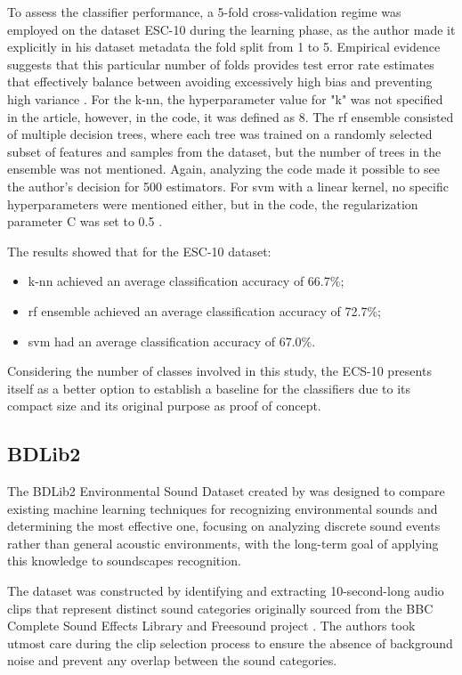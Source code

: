 To assess the classifier performance, a 5-fold cross-validation regime was employed on the dataset ESC-10 during the learning phase, as the author made it explicitly in his dataset metadata the fold split from 1 to 5. Empirical evidence suggests that this particular number of folds provides test error rate estimates that effectively balance between avoiding excessively high bias and preventing high variance \cite{James2013}. For the \gls{k-nn}, the hyperparameter value for "k" was not specified in the article, however, in the code, it was defined as 8. The \gls{rf} ensemble consisted of multiple decision trees, where each tree was trained on a randomly selected subset of features and samples from the dataset, but the number of trees in the ensemble was not mentioned. Again, analyzing the code made it possible to see the author's decision for 500 estimators. For \gls{svm} with a linear kernel, no specific hyperparameters were mentioned either, but in the code, the regularization parameter C was set to 0.5 \cite{PiczakESC2015}.

The results showed that for the ESC-10 dataset: 
\begin{itemize}
    \item \gls{k-nn} achieved an average classification accuracy of 66.7\%;
    \item \gls{rf} ensemble achieved an average classification accuracy of 72.7\%;
    \item \gls{svm} had an average classification accuracy of 67.0\%. 
\end{itemize}

Considering the number of classes involved in this study, the ECS-10 presents itself as a better option to establish a baseline for the classifiers due to its compact size and its original purpose as proof of concept.

\subsection{BDLib2}
\label{subsec:dataset_BDLib2}

The BDLib2 Environmental Sound Dataset created by \textcite{Bountourakis2015} was designed to compare existing machine learning techniques for recognizing environmental sounds and determining the most effective one, focusing on analyzing discrete sound events rather than general acoustic environments, with the long-term goal of applying this knowledge to soundscapes recognition.

The dataset was constructed by identifying and extracting 10-second-long audio clips that represent distinct sound categories originally sourced from the BBC Complete Sound Effects Library \cite{BBC2023} and Freesound project \cite{Font_freesound2013}. The authors took utmost care during the clip selection process to ensure the absence of background noise and prevent any overlap between the sound categories.

